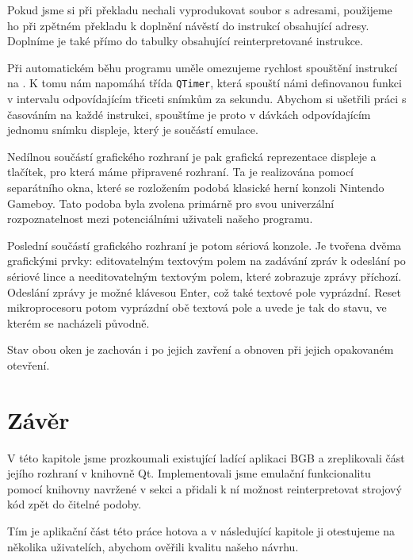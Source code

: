Pokud jsme si při překladu nechali vyprodukovat soubor s adresami, použijeme ho při zpětném překladu k doplnění návěstí do instrukcí obsahující adresy. Doplníme je také přímo do tabulky obsahující reinterpretované instrukce.

Při automatickém běhu programu uměle omezujeme rychlost spouštění instrukcí na . K tomu nám napomáhá třída \texttt{QTimer}, která spouští námi definovanou funkci v intervalu odpovídajícím třiceti snímkům za sekundu. Abychom si ušetřili práci s časováním na každé instrukci, spouštíme je proto v dávkách odpovídajícím jednomu snímku displeje, který je součástí emulace.

Nedílnou součástí grafického rozhraní je pak grafická reprezentace displeje a tlačítek, pro která máme připravené rozhraní. Ta je realizována pomocí separátního okna, které se rozložením podobá klasické herní konzoli Nintendo Gameboy. Tato podoba byla zvolena primárně pro svou univerzální rozpoznatelnost mezi potenciálními uživateli našeho programu.


Poslední součástí grafického rozhraní je potom sériová konzole. Je tvořena dvěma grafickými prvky: editovatelným textovým polem na zadávání zpráv k odeslání po sériové lince a needitovatelným textovým polem, které zobrazuje zprávy příchozí. Odeslání zprávy je možné klávesou Enter, což také textové pole vyprázdní. Reset mikroprocesoru potom vyprázdní obě textová pole a uvede je tak do stavu, ve kterém se nacházeli původně.


Stav obou oken je zachován i po jejich zavření a obnoven při jejich opakovaném otevření.

\section{Závěr}

V této kapitole jsme prozkoumali existující ladící aplikaci BGB a zreplikovali část jejího rozhraní v knihovně Qt. Implementovali jsme emulační funkcionalitu pomocí knihovny navržené v sekci  a přidali k ní možnost reinterpretovat strojový kód zpět do čitelné podoby.

Tím je aplikační část této práce hotova a v následující kapitole ji otestujeme na několika uživatelích, abychom ověřili kvalitu našeho návrhu.